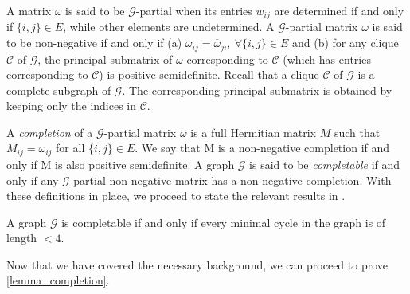 A matrix $\omega$ is said to be $\mathcal{G}$-partial when its entries $w_{ij}$ are determined if and only if $\{i,j\}\in E$, while other elements are undetermined.
A $\mathcal{G}$-partial matrix $\omega$ is said to be non-negative if and only if (a) $\omega_{ij}=\overline{\omega}_{ji}, \ \forall\{i,j\}\in E$ and (b) for any clique $\mathcal C$ of $\mathcal{G}$, the principal submatrix of $\omega$ corresponding to $\mathcal C$ (which has entries corresponding to $\mathcal C$) is positive semidefinite. Recall that a clique $\mathcal C$ of $\mathcal G$ is a complete subgraph of $\mathcal G$. The corresponding principal submatrix is obtained by keeping only the indices in $\mathcal C$.


A {\it completion} of a $\mathcal{G}$-partial matrix $\omega$ is a full Hermitian
matrix $M$ such that $M_{ij} = \omega_{ij}$ for all $\{i, j\} \in E$. We say that M is a non-negative completion if and only if M is also positive semidefinite.
A graph $\mathcal{G}$ is said to be {\it completable} if and only if any $\mathcal{G}$-partial non-negative matrix has a non-negative completion. With these definitions in place, we proceed to state the relevant results in \citet{GRONE1984109}.


\begin{lemma}\label{lemma.graph.grone}
        A graph $\mathcal{G}$ is completable if and only if every minimal cycle in the graph is of length $< 4$.
\end{lemma}

\noindent Now that we have covered the necessary background, we can proceed to prove \cref{lemma_completion}.


